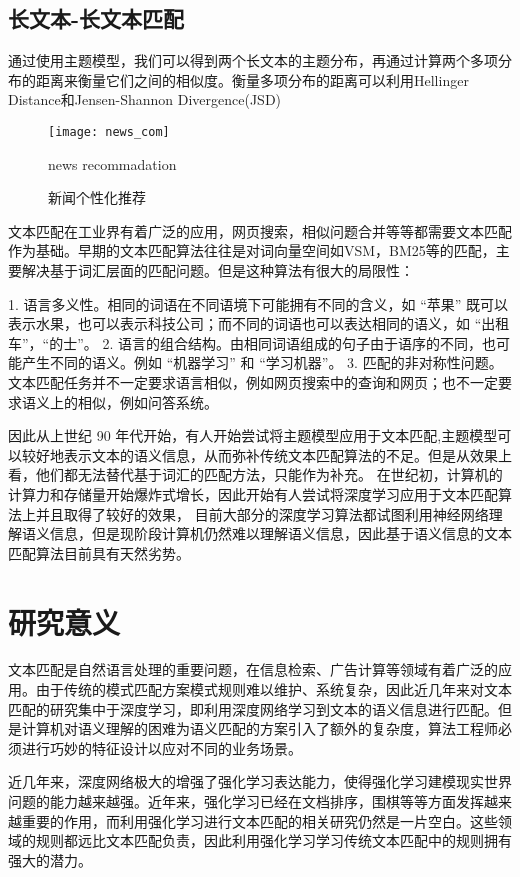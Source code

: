 \subsection{长文本-长文本匹配}
通过使用主题模型，我们可以得到两个长文本的主题分布，再通过计算两个多项分布的距离来衡量它们之间的相似度。衡量多项分布的距离可以利用Hellinger Distance\citep{website:Hellinger}和Jensen-Shannon Divergence(JSD)\citep{website:Shannondivergence}

\begin{figure}[!htbp]
  \centering
  \texttt{[image: news\_com]}
  \caption{新闻个性化推荐}{news recommadation}
  \label{fig:news_recom}
\end{figure}

文本匹配在工业界有着广泛的应用，网页搜索，相似问题合并等等都需要文本匹配作为基础。早期的文本匹配算法往往是对词向量空间如VSM，BM25等的匹配，主要解决基于词汇层面的匹配问题。但是这种算法有很大的局限性：

1. 语言多义性。相同的词语在不同语境下可能拥有不同的含义，如 “苹果” 既可以表示水果，也可以表示科技公司；而不同的词语也可以表达相同的语义，如 “出租车”，“的士”。
2. 语言的组合结构。由相同词语组成的句子由于语序的不同，也可能产生不同的语义。例如 “机器学习” 和 “学习机器”。
3. 匹配的非对称性问题。文本匹配任务并不一定要求语言相似，例如网页搜索中的查询和网页；也不一定要求语义上的相似，例如问答系统。

因此从上世纪 90 年代开始，有人开始尝试将主题模型应用于文本匹配,主题模型可以较好地表示文本的语义信息，从而弥补传统文本匹配算法的不足。但是从效果上看，他们都无法替代基于词汇的匹配方法，只能作为补充。
在世纪初，计算机的计算力和存储量开始爆炸式增长，因此开始有人尝试将深度学习应用于文本匹配算法上并且取得了较好的效果，
目前大部分的深度学习算法都试图利用神经网络理解语义信息，但是现阶段计算机仍然难以理解语义信息，因此基于语义信息的文本匹配算法目前具有天然劣势。

\section{研究意义}
文本匹配是自然语言处理的重要问题，在信息检索、广告计算等领域有着广泛的应用。由于传统的模式匹配方案模式规则难以维护、系统复杂，因此近几年来对文本匹配的研究集中于深度学习，即利用深度网络学习到文本的语义信息进行匹配。但是计算机对语义理解的困难为语义匹配的方案引入了额外的复杂度，算法工程师必须进行巧妙的特征设计以应对不同的业务场景。

近几年来，深度网络极大的增强了强化学习表达能力，使得强化学习建模现实世界问题的能力越来越强。近年来，强化学习已经在文档排序，围棋等等方面发挥越来越重要的作用，而利用强化学习进行文本匹配的相关研究仍然是一片空白。这些领域的规则都远比文本匹配负责，因此利用强化学习学习传统文本匹配中的规则拥有强大的潜力。

